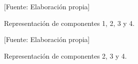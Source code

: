 \begin{figure}[H]
 \centering
  \caption{Representación de componentes 1, 2, 3 y 4. }
   
 \label{f:animales}
 \begin{center}
    [Fuente:  Elaboración propia]
\end{center}
\end{figure}



\begin{figure}[H]
 \centering
  \caption{Representación de componentes 2, 3 y 4. }
   

 \begin{center}
    [Fuente:  Elaboración propia]
\end{center}
\end{figure}

